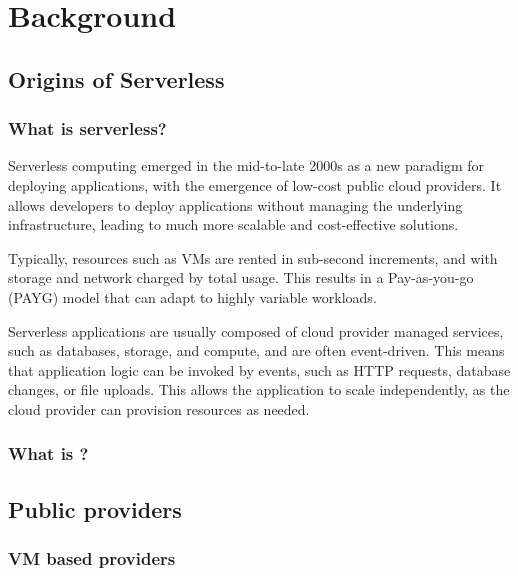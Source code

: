 \chapter{Background}

\section{Origins of Serverless}
\subsection{What is serverless?}
Serverless computing emerged in the mid-to-late 2000s\cite{wardleyWardleyMaps2022,IntroducingGoogleApp,patilServerlessComputingEmergence2021} as a new paradigm for deploying applications, with the emergence of low-cost public cloud providers\cite{patilServerlessComputingEmergence2021,BenjaminBlackEC2}. It allows developers to deploy applications without managing the underlying infrastructure, leading to much more scalable and cost-effective solutions.

Typically, resources such as VMs\cite{hoeferTaxonomyCloudComputing2010} are rented in sub-second increments, and with storage and network charged by total usage. This results in a Pay-as-you-go (PAYG) model that can adapt to highly variable workloads\cite{sehgalCostBillingPractices2023,hilleyCloudComputingTaxonomy2009}.

Serverless applications are usually composed of cloud provider managed services, such as databases, storage, and compute, and are often event-driven\cite{EventarcOverview,EventListenerAmazon,robeceOverviewAzureEvent2024}. This means that application logic can be invoked by events, such as HTTP requests, database changes, or file uploads. This allows the application to scale independently\cite{goniwadaCloudNativeArchitecture2022}, as the cloud provider can provision resources as needed.

\subsection{What is \faas{}?}

\section{Public \faas{} providers}
\subsection{VM based providers}


